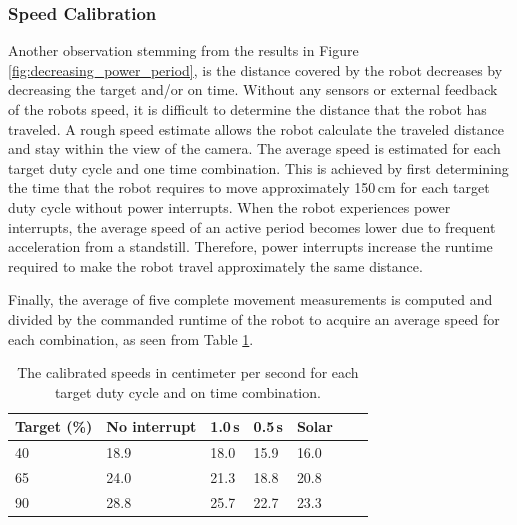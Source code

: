 \subsubsection{Speed Calibration}
Another observation stemming from the results in Figure \ref{fig:decreasing_power_period}, is the distance covered by the robot decreases by decreasing the target and/or on time.
Without any sensors or external feedback of the robots speed, it is difficult to determine the distance that the robot has traveled.
A rough speed estimate allows the robot calculate the traveled distance and stay within the view of the camera.
The average speed is estimated for each target duty cycle and one time combination.
This is achieved by first determining the time that the robot requires to move approximately 150\,cm for each target duty cycle without power interrupts.
When the robot experiences power interrupts, the average speed of an active period becomes lower due to frequent acceleration from a standstill.
Therefore, power interrupts increase the runtime required to make the robot travel approximately the same distance.

Finally, the average of five complete movement measurements is computed and divided by the commanded runtime of the robot to acquire an average speed for each combination, as seen from Table \ref{tab:val_calib}.


\begin{table}[t]
	\centering
	\small
	\caption{The calibrated speeds in centimeter per second for each target duty cycle and on time combination.}
	\label{tab:val_calib}
	\begin{tabular}{|l||l|l|l|l|l|l|}
		\hline
		Target (\%) & No interrupt & 1.0\,s & 0.5\,s & Solar \\
		\hline \hline
		 40 & 18.9 & 18.0 & 15.9 & 16.0\\
	     65 & 24.0 & 21.3 & 18.8 & 20.8\\
		 90 & 28.8 & 25.7 & 22.7 & 23.3\\
		\hline
	\end{tabular}
\end{table}


